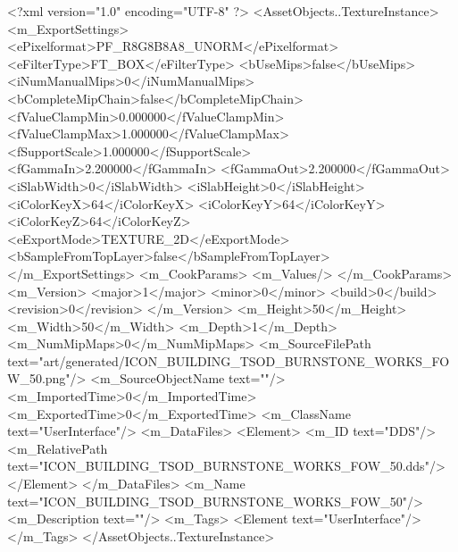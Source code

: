 <?xml version="1.0" encoding="UTF-8" ?>
<AssetObjects..TextureInstance>
	<m_ExportSettings>
		<ePixelformat>PF_R8G8B8A8_UNORM</ePixelformat>
		<eFilterType>FT_BOX</eFilterType>
		<bUseMips>false</bUseMips>
		<iNumManualMips>0</iNumManualMips>
		<bCompleteMipChain>false</bCompleteMipChain>
		<fValueClampMin>0.000000</fValueClampMin>
		<fValueClampMax>1.000000</fValueClampMax>
		<fSupportScale>1.000000</fSupportScale>
		<fGammaIn>2.200000</fGammaIn>
		<fGammaOut>2.200000</fGammaOut>
		<iSlabWidth>0</iSlabWidth>
		<iSlabHeight>0</iSlabHeight>
		<iColorKeyX>64</iColorKeyX>
		<iColorKeyY>64</iColorKeyY>
		<iColorKeyZ>64</iColorKeyZ>
		<eExportMode>TEXTURE_2D</eExportMode>
		<bSampleFromTopLayer>false</bSampleFromTopLayer>
	</m_ExportSettings>
	<m_CookParams>
		<m_Values/>
	</m_CookParams>
	<m_Version>
		<major>1</major>
		<minor>0</minor>
		<build>0</build>
		<revision>0</revision>
	</m_Version>
	<m_Height>50</m_Height>
	<m_Width>50</m_Width>
	<m_Depth>1</m_Depth>
	<m_NumMipMaps>0</m_NumMipMaps>
	<m_SourceFilePath text="art/generated/ICON_BUILDING_TSOD_BURNSTONE_WORKS_FOW_50.png"/>
	<m_SourceObjectName text=""/>
	<m_ImportedTime>0</m_ImportedTime>
	<m_ExportedTime>0</m_ExportedTime>
	<m_ClassName text="UserInterface"/>
	<m_DataFiles>
		<Element>
			<m_ID text="DDS"/>
			<m_RelativePath text="ICON_BUILDING_TSOD_BURNSTONE_WORKS_FOW_50.dds"/>
		</Element>
	</m_DataFiles>
	<m_Name text="ICON_BUILDING_TSOD_BURNSTONE_WORKS_FOW_50"/>
	<m_Description text=""/>
	<m_Tags>
		<Element text="UserInterface"/>
	</m_Tags>
</AssetObjects..TextureInstance>

